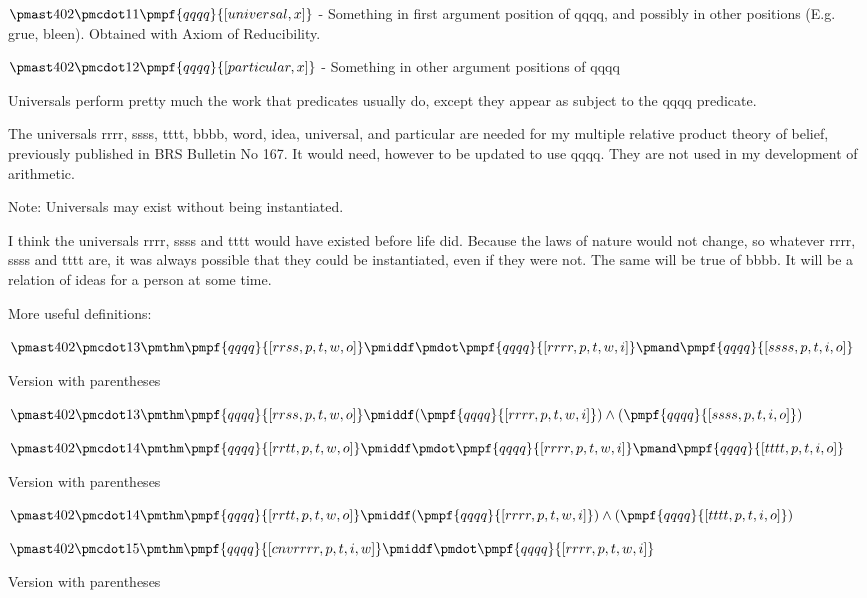 \documentclass[12pt]{article}
\begin{document}
$\pmast 402 \pmcdot 11 \pmpf{qqqq}{[universal, x]}$ - Something in first argument position of qqqq, and possibly in other positions (E.g. grue, bleen). Obtained with Axiom of Reducibility.

$\pmast 402 \pmcdot 12 \pmpf{qqqq}{[particular, x]}$ - Something in other argument positions of qqqq

Universals perform pretty much the work that predicates usually do, except they appear as subject to the qqqq predicate.

The universals rrrr, ssss, tttt, bbbb, word, idea, universal, and particular are needed for my multiple relative product theory of belief, previously published in BRS Bulletin No 167. It would need, however to be updated to use qqqq.
They are not used in my development of arithmetic.

Note: Universals may exist without being instantiated.

I think the universals rrrr, ssss and tttt would have existed before life did. Because the laws of nature would not change, so whatever rrrr, ssss and tttt are, it was always possible that they could be instantiated, even if they were not. The same will be true of bbbb. It will be a relation of ideas for a person at some time.

More useful definitions:

$\pmast 402 \pmcdot 13 \pmthm \pmpf{qqqq}{[rrss, p, t, w, o]} \pmiddf \pmdot \pmpf{qqqq}{[rrrr, p, t, w, i]} \pmand \pmpf{qqqq}{[ssss, p, t, i, o]} $
 
 

Version with parentheses

$\pmast 402 \pmcdot 13 \pmthm \pmpf{qqqq}{[rrss, p, t, w, o]} \pmiddf  (  \pmpf{qqqq}{[rrrr, p, t, w, i]} ) \land ( \pmpf{qqqq}{[ssss, p, t, i, o]} )$


$\pmast 402 \pmcdot 14 \pmthm \pmpf{qqqq}{[rrtt, p, t, w, o]} \pmiddf \pmdot \pmpf{qqqq}{[rrrr, p, t, w, i]} \pmand \pmpf{qqqq}{[tttt, p, t, i, o]} $
 
 

Version with parentheses

$\pmast 402 \pmcdot 14 \pmthm \pmpf{qqqq}{[rrtt, p, t, w, o]} \pmiddf  (  \pmpf{qqqq}{[rrrr, p, t, w, i]} ) \land ( \pmpf{qqqq}{[tttt, p, t, i, o]} )$


$\pmast 402 \pmcdot 15 \pmthm \pmpf{qqqq}{[cnvrrrr, p, t, i, w]} \pmiddf \pmdot \pmpf{qqqq}{[rrrr, p, t, w, i]} $
 
 

Version with parentheses
\end{document}
